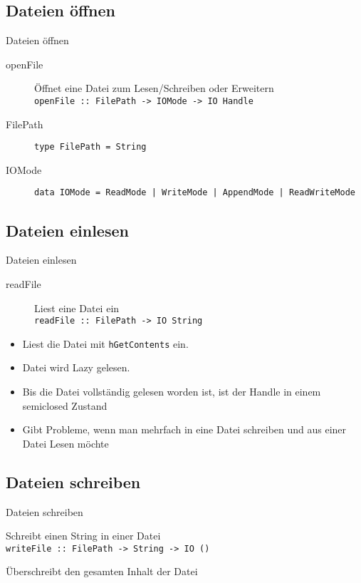 \documentclass{beamer}
\begin{document}
\subsection{Dateien \"offnen}
\begin{frame}[<+->]{Dateien \"offnen}
\begin{description}
\item[openFile] Öffnet eine Datei zum Lesen/Schreiben oder Erweitern \\ \texttt{\small openFile :: FilePath -> IOMode -> IO Handle}
\item[FilePath] \texttt{type FilePath = String}
\item[IOMode] \texttt{data IOMode = ReadMode | WriteMode | AppendMode | ReadWriteMode}
\end{description}
\end{frame}

\subsection{Dateien einlesen}
\begin{frame}{Dateien einlesen}
\begin{description}
\item[readFile] Liest eine Datei ein \\ \texttt{readFile :: FilePath -> IO String}
\end{description}
\begin{itemize}
\item Liest die Datei mit \texttt{hGetContents} ein.
\item Datei wird Lazy gelesen.
\item Bis die Datei vollständig gelesen worden ist, ist der Handle in einem semiclosed Zustand
\item Gibt Probleme, wenn man mehrfach in eine Datei schreiben und aus einer Datei Lesen möchte
\end{itemize}
\end{frame}

\subsection{Dateien schreiben}
\begin{frame}{Dateien schreiben}
\begin{description}
\item[writeFile] Schreibt einen String in einer Datei \\ \texttt{writeFile :: FilePath -> String -> IO ()}
\item Überschreibt den gesamten Inhalt der Datei
\end{description}
\end{frame}
\end{document}
